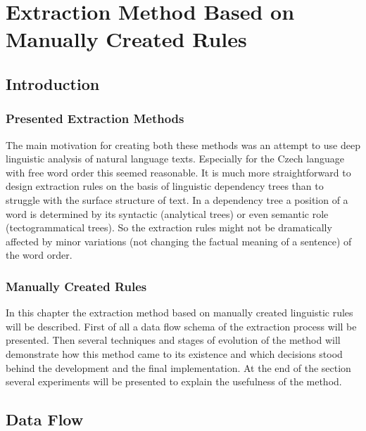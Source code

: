 \chapter{Extraction Method Based on Manually Created Rules}
\graphicspath{{../img/ch50/}}

\section{Introduction}

\subsection{Presented Extraction Methods}

The main motivation for creating both these methods was an attempt to use deep linguistic analysis of natural language texts. Especially for the Czech language with free word order this seemed reasonable. It is much more straightforward to design extraction rules on the basis of linguistic dependency trees than to struggle with the surface structure of text. In a dependency tree a position of a word is determined by its syntactic (analytical trees) or even semantic role (tectogrammatical trees). So the extraction rules might not be dramatically affected by minor variations (not changing the factual meaning of a sentence) of the word order.


\subsection{Manually Created Rules}
In this chapter the extraction method based on manually created linguistic rules will be described. First of all a data flow schema of the extraction process will be presented. Then several techniques and stages of evolution of the method will demonstrate how this method came to its existence and which decisions stood behind the development and the final implementation. At the end of the section several experiments will be presented to explain the usefulness of the method. 


\section{Data Flow} \label{sec:ch50_data_flow}

